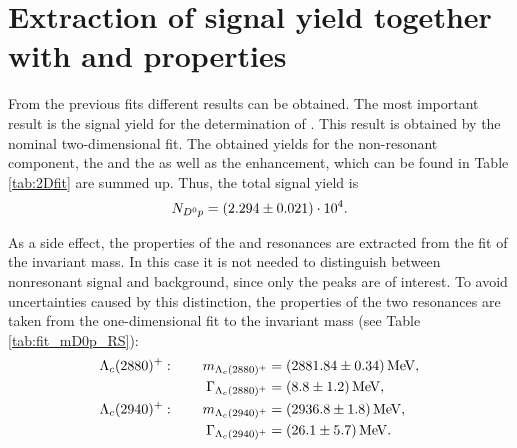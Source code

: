 \section{Extraction of \LbToDpmunuX signal yield together with \LcResI and \LcResII properties}
\label{sec:Signalyield_D0p}
From the previous fits different results can be obtained. 
The most important result is the \LbToDpmunuX signal yield \NDp for the determination of \R.
This result is obtained by the nominal two-dimensional fit.
The obtained yields for the non-resonant component, the \LcResI and the \LcResII as well as the enhancement, which can be found in Table \ref{tab:2Dfit} are summed up.
Thus, the total \LbToDpmunuX signal yield is
\begin{align*}
    N_{{{D}^0}{p}} = (2.294 \pm 0.021)\cdot 10^{4}. 
\end{align*}

As a side effect, the properties of the \LcResI and \LcResII resonances are extracted from the fit of the invariant \Dz\proton mass.
In this case it is not needed to distinguish between nonresonant signal and background, since only the peaks are of interest. 
To avoid uncertainties caused by this distinction, the properties of the two resonances are taken from the one-dimensional fit to the invariant \Dz\proton mass (see Table \ref{tab:fit_mD0p_RS}):
\begin{align*}
    {\ensuremath{\Lambda}}_{c}(2880)^+: \qquad  m_{{\Lambda}_{c}(2880)^+}       &= (2881.84 \pm 0.34) \mathrm{\,Me\kern -0.1em V}, \\
                     \Gamma_{{\Lambda}_{c}(2880)^+}  &= (8.8 \pm 1.2) \mathrm{\,Me\kern -0.1em V}, \\
    {\Lambda}_{c}(2940)^+: \qquad m_{{\Lambda}_{c}(2940)^+}      &= (2936.8 \pm 1.8) \mathrm{\,Me\kern -0.1em V}, \\
                     \Gamma_{{\Lambda}_{c}(2940)^+} &= (26.1 \pm 5.7) \mathrm{\,Me\kern -0.1em V}. \\
\end{align*}
